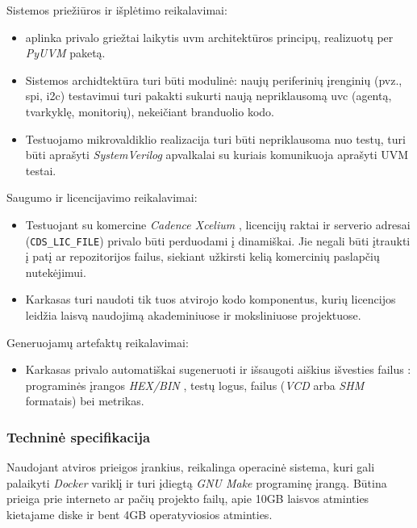 Sistemos priežiūros ir išplėtimo reikalavimai:
\begin{itemize}
	\item {} aplinka privalo griežtai laikytis \gls{uvm} architektūros principų, realizuotų per \textit{PyUVM} paketą.
	\item Sistemos archidtektūra turi būti modulinė: naujų  periferinių įrenginių (pvz., \gls{spi}, \gls{i2c}) testavimui turi pakakti sukurti naują nepriklausomą \gls{uvc} (agentą, tvarkyklę, monitorių), nekeičiant branduolio kodo.
	\item Testuojamo mikrovaldiklio realizacija turi būti nepriklausoma nuo testų, turi būti aprašyti \textit{SystemVerilog} apvalkalai su kuriais komunikuoja aprašyti UVM testai.
\end{itemize}

Saugumo ir licencijavimo reikalavimai:
\begin{itemize}
	\item Testuojant su komercine \textit{Cadence Xcelium} , licencijų raktai ir serverio adresai (\texttt{CDS\_LIC\_FILE}) privalo būti perduodami į  dinamiškai. Jie negali būti įtraukti į patį  ar repozitorijos failus, siekiant užkirsti kelią komercinių paslapčių nutekėjimui.
	\item Karkasas turi naudoti tik tuos atvirojo kodo komponentus, kurių licencijos leidžia laisvą naudojimą akademiniuose ir moksliniuose projektuose.
\end{itemize}

Generuojamų artefaktų reikalavimai:
\begin{itemize}
	\item Karkasas privalo automatiškai sugeneruoti ir išsaugoti aiškius išvesties failus \pav{\ref{fig:uml_realization_architecture}}: programinės įrangos \textit{HEX/BIN} , testų logus,  failus (\textit{VCD} arba \textit{SHM} formatais) bei  metrikas.
\end{itemize}

\subsubsection{Techninė specifikacija}

Naudojant atviros prieigos įrankius, reikalinga operacinė sistema, kuri gali palaikyti \textit{Docker} variklį ir turi įdiegtą \textit{GNU Make} programinę įrangą. Būtina prieiga prie interneto ar pačių projekto failų, apie 10GB laisvos atminties kietajame diske ir bent 4GB operatyviosios atminties.

